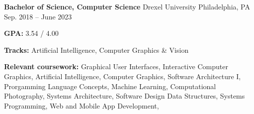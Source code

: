 \begin{cventries}
    \cventry
    {\textbf{Bachelor of Science, Computer Science}} %
    {Drexel University} %
    {Philadelphia, PA} %
    {Sep. 2018 -- June 2023} %
    {
      \begin{cvitems} %
        \item {\textbf{GPA:} 3.54 / 4.00}
        \item {\textbf{Tracks:} Artificial Intelligence, Computer Graphics \& Vision}
        \item {\color{darktext} \textbf{Relevant coursework:}
                    Graphical User Interfaces,
                    Interactive Computer Graphics,
                    Artificial Intelligence,
                    Computer Graphics,
                    Software Architecture I,
                    Prorgamming Language Concepts,
                    Machine Learning, 
                    Computational Photography, 
                    Systems Architecture,
                    Software Design
                    Data Structures,
                    Systems Programming,
                    Web and Mobile App Development,
              }
      \end{cvitems}}

\end{cventries}
